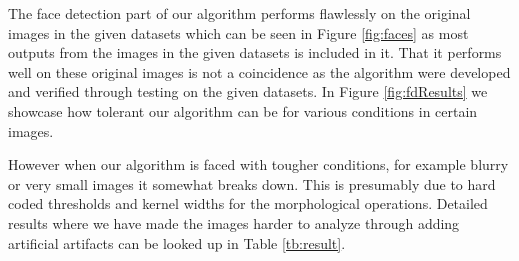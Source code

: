 
The face detection part of our algorithm performs flawlessly on the original images in the given datasets which can be seen in Figure \ref{fig:faces} as most outputs from the images in the given datasets is included in it. That it performs well on these original images is not a coincidence as the algorithm were developed and verified through testing on the given datasets. In Figure \ref{fig:fdResults} we showcase how tolerant our algorithm can be for various conditions in certain images.



However when our algorithm is faced with tougher conditions, for example blurry  or very small images it somewhat breaks down. This is presumably due to hard coded thresholds and kernel widths for the morphological operations. Detailed results where we have made the images harder to analyze through adding artificial artifacts can be looked up in Table \ref{tb:result}.





